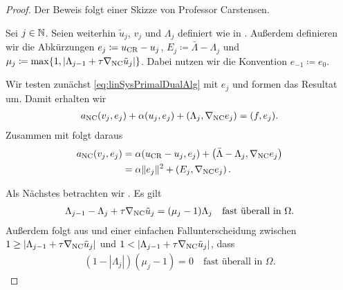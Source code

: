 \begin{proof}
  Der Beweis folgt einer Skizze von Professor Carstensen.
  
  Sei $j\in\mathbb{N}$. 
  Seien weiterhin $\tilde{u}_j$, $v_j$ und $\Lambda_j$ definiert wie in
  .
  Außerdem definieren wir die Abkürzungen $e_j \coloneqq u_\textup{CR}-u_j$,
  $E_j\coloneqq \bar\Lambda-\Lambda_j$ und $\mu_j\coloneqq
  \max\{1,|\Lambda_{j-1}+\tau \nabla_\textup{NC} \tilde{u}_j|\}$.
  Dabei nutzen wir die Konvention $e_{-1}\coloneqq e_0$.

  Wir testen zunächst \eqref{eq:linSysPrimalDualAlg} mit $e_j$ und formen das
  Resultat um. 
  Damit erhalten wir
  \begin{align*}
    a_\textup{NC}(v_j,e_j) + \alpha(u_j,e_j) 
    + (\Lambda_j,\nabla_\textup{NC} e_j)
    = 
    (f,e_j).
  \end{align*}
  Zusammen mit  folgt daraus
  \begin{equation}
    \label{eq:convProofE}
    \begin{aligned}
      a_\textup{NC}(v_j,e_j) &= 
      \alpha(u_\textup{CR}-u_j,e_j) 
      + \left(\bar\Lambda-\Lambda_j,\nabla_\textup{NC} e_j\right) \\
      &= 
      \alpha\Vert e_j\Vert^2 + \left(E_j,\nabla_\textup{NC} e_j\right).
    \end{aligned}
  \end{equation}

  Als Nächstes betrachten wir . Es gilt
  \begin{align}
    \label{eq:convProofA}
    \Lambda_{j-1}-\Lambda_j+\tau \nabla_\textup{NC} \tilde{u}_j 
    = (\mu_j-1)\Lambda_j \quad\text{fast überall in }\Omega.
  \end{align}
  Außerdem folgt aus  und einer einfachen
  Fallunterscheidung zwischen $1\geq |\Lambda_{j-1}+\tau\nabla_\textup{NC} \tilde{u}_j|$
  und $1< |\Lambda_{j-1}+\tau\nabla_\textup{NC} \tilde{u}_j|$, dass
  \begin{align}
    \label{eq:convergenceIterationMuProductZero}
    \left(1-|\Lambda_j|\right)(\mu_j-1)=0
    \quad\text{fast überall in } \Omega.
  \end{align}


\end{proof}
